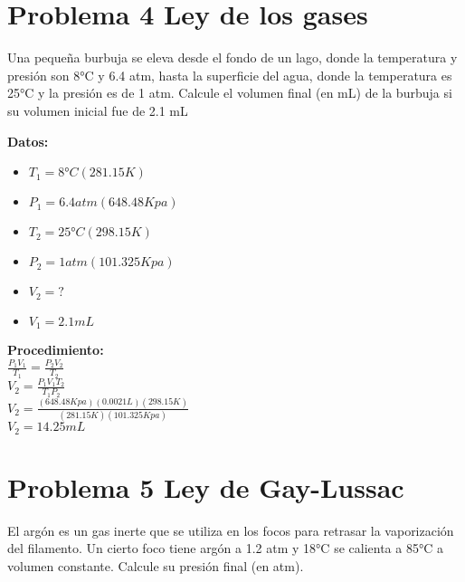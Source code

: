 \documentclass[12pt, letterpaper]{article}
\begin{document}
\section{Problema 4 Ley de los gases}
Una pequeña burbuja se eleva desde el fondo de un lago, donde la temperatura y presión son 8°C
y 6.4 atm, hasta la superficie del agua, donde la temperatura es 25°C y la presión es de 1 atm.
Calcule el volumen final (en mL) de la burbuja si su volumen inicial fue de 2.1 mL
\begin{multicols}{2}
\large \textbf{Datos:}
\begin{itemize}
    \item $T_1 = 8°C(281.15K)$
    \item $P_1 = 6.4 atm (648.48 Kpa)$
    \item $T_2 = 25°C (298.15K)$
    \item $P_2 = 1atm (101.325Kpa)$
    \item $V_2 = ?$
    \item $V_1 = 2.1 mL$ 
\end{itemize}
\columnbreak

\large \textbf{Procedimiento:}\\

\large {$\frac{P_1V_1}{T_1}=\frac{P_2V_2}{T_2}$}\\

\large {$V_2 =\frac{P_1V_1T_2}{T_1P_2}$}\\

\large {$V_2 =\frac{(648.48Kpa)(0.0021L)(298.15K)}{(281.15K)(101.325Kpa)}$}\\

\ul {\large $V_2 = 14.25 mL$}
\end{multicols}


\section{Problema 5 Ley de Gay-Lussac}

El argón es un gas inerte que se utiliza en los focos para retrasar la vaporización del filamento. Un
cierto foco tiene argón a 1.2 atm y 18°C se calienta a 85°C a volumen constante. Calcule su presión
final (en atm).
\end{document}

